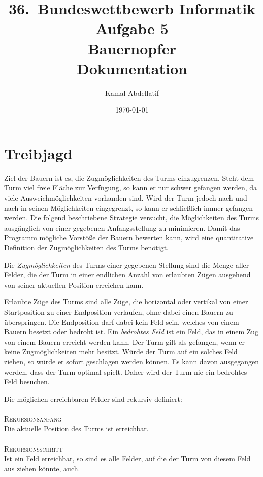 \documentclass[a4paper, 11pt]{scrartcl}
\title{36.\ Bundeswettbewerb Informatik\\Aufgabe 5\\Bauernopfer\\Dokumentation}
\author{Kamal Abdellatif}
\date{\today}
\begin{document}
\maketitle

\section*{Treibjagd}
Ziel der Bauern ist es, die Zugmöglichkeiten des Turms einzugrenzen. Steht dem Turm viel freie Fläche zur Verfügung, so kann er nur schwer gefangen werden, da viele Ausweichmöglichkeiten vorhanden sind. Wird der Turm jedoch nach und nach in seinen Möglichkeiten eingegrenzt, so kann er schließlich immer gefangen werden. Die folgend beschriebene Strategie versucht, die Möglichkeiten des Turms ausgänglich von einer gegebenen Anfangsstellung zu minimieren. Damit das Programm mögliche Vorstöße der Bauern bewerten kann, wird eine quantitative Definition der Zugmöglichkeiten des Turms benötigt.

\begin{framed}
	Die \emph{Zugmöglichkeiten} des Turms einer gegebenen Stellung sind die Menge aller Felder, die der Turm in einer endlichen Anzahl von erlaubten Zügen ausgehend von seiner aktuellen Position erreichen kann.
\end{framed}
Erlaubte Züge des Turms sind alle Züge, die horizontal oder vertikal von einer Startposition zu einer Endposition verlaufen, ohne dabei einen Bauern zu überspringen. Die Endposition darf dabei kein Feld sein, welches von einem Bauern besetzt oder bedroht ist. Ein \emph{bedrohtes Feld} ist ein Feld, das in einem Zug von einem Bauern erreicht werden kann. Der Turm gilt als gefangen, wenn er keine Zugmöglichkeiten mehr besitzt.
\newpage
Würde der Turm auf ein solches Feld ziehen, so würde er sofort geschlagen werden können. Es kann davon ausgegangen werden, dass der Turm optimal spielt. Daher wird der Turm nie ein bedrohtes Feld besuchen.

Die möglichen erreichbaren Felder sind rekursiv definiert:\\\\
\textsc{Rekursionsanfang}\\ Die aktuelle Position des Turms ist erreichbar. \\\\
\textsc{Rekursionsschritt}\\ Ist ein Feld erreichbar, so sind es alle Felder, auf die der Turm von diesem Feld aus ziehen könnte, auch.
\end{document}
